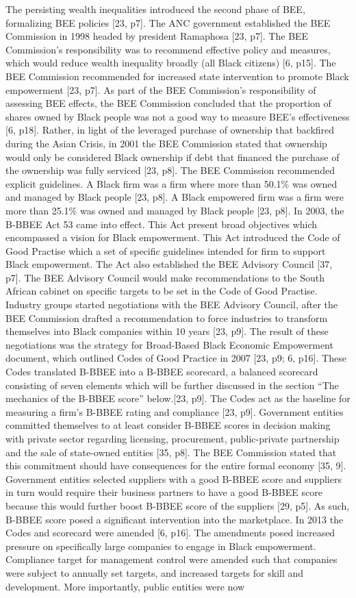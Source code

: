The persisting wealth inequalities introduced the second phase of BEE, formalizing BEE policies [23, p7]. The ANC government established the BEE Commission in 1998 headed by president Ramaphosa [23, p7]. The BEE Commission’s responsibility was to recommend effective policy and measures, which would reduce wealth inequality broadly (all Black citizens) [6, p15]. The BEE Commission recommended for increased state intervention to promote Black empowerment [23, p7]. As part of  the BEE Commission’s responsibility of assessing BEE effects, the BEE Commission concluded that the proportion of shares owned by Black people was not a good way to measure BEE’s effectiveness [6, p18]. Rather, in light of the leveraged purchase of ownership that backfired during the Asian Crisis, in 2001 the BEE Commission stated that ownership would only be considered Black ownership if debt that financed the purchase of the ownership was fully serviced [23, p8]. The BEE Commission recommended explicit guidelines. A Black firm was a firm where more than 50.1\% was owned and managed by Black people [23, p8]. A Black empowered firm was a firm were more than 25.1\% was owned and managed by Black people [23, p8]. In 2003, the B-BBEE Act 53 came into effect. This Act present broad objectives which encompassed a vision for Black empowerment. This Act introduced the Code of Good Practise which a set of specific guidelines intended for firm to support Black empowerment. The Act also established the BEE Advisory Council [37, p7]. The BEE Advisory Council would make recommendations to the South African cabinet on specific targets to be set in the Code of Good Practise. Industry groups started negotiations with the BEE Advisory Council, after the BEE Commission drafted a recommendation to force industries to transform themselves into Black companies within 10 years [23, p9]. The result of these negotiations was the strategy for Broad-Based Black Economic Empowerment document, which outlined Codes of Good Practice in 2007 [23, p9; 6, p16]. These Codes translated B-BBEE into a B-BBEE scorecard, a balanced scorecard consisting of seven elements which will be further discussed in the section “The mechanics of the B-BBEE score” below.[23, p9]. The Codes act as the baseline for measuring a firm’s B-BBEE rating and compliance [23, p9]. Government entities committed themselves to at least consider B-BBEE scores in decision making with private sector regarding  licensing, procurement, public-private partnership and the sale of state-owned entities [35, p8]. The BEE Commission stated that this commitment should have consequences for the entire formal economy [35, 9]. Government entities selected suppliers with a good B-BBEE score and suppliers in turn would require their business partners to have a good B-BBEE score because this would further boost B-BBEE score of the suppliers [29, p5].  As such, B-BBEE score posed a significant intervention into the marketplace. In 2013 the Codes and scorecard were amended [6, p16].  The amendments posed increased pressure on specifically large companies to engage in Black empowerment. Compliance target for management control were amended such that companies were subject to annually set targets, and increased targets for skill and development. More importantly, public entities were now 